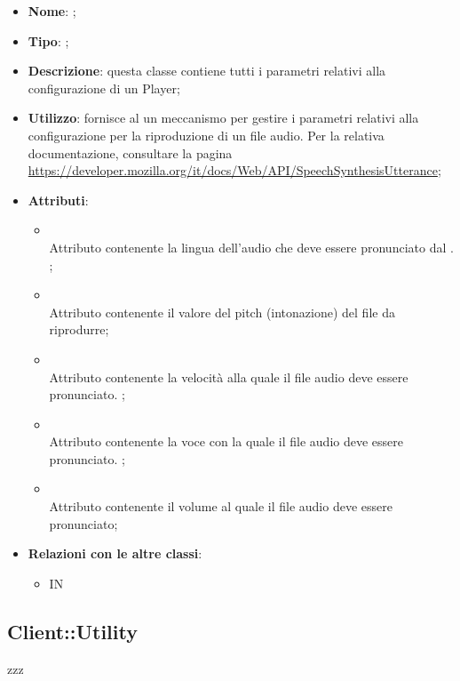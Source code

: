 \begin{itemize}
	\item \textbf{Nome}: ;
	\item \textbf{Tipo}: ;
	\item \textbf{Descrizione}: questa classe contiene tutti i parametri relativi alla configurazione di un Player;
	\item \textbf{Utilizzo}: fornisce al  un meccanismo per gestire i parametri relativi alla configurazione per la riproduzione di un file audio.
Per la relativa documentazione, consultare la pagina \url{https://developer.mozilla.org/it/docs/Web/API/SpeechSynthesisUtterance};
	\item \textbf{Attributi}:
	\begin{itemize}
		\item[]  \\
		Attributo contenente la lingua dell'audio che deve essere pronunciato dal . ;
		\item[]  \\
		Attributo contenente il valore del pitch (intonazione) del file da riprodurre;
		\item[]  \\
		Attributo contenente la velocità alla quale il file audio deve essere pronunciato. ;
		\item[]  \\
		Attributo contenente la voce con la quale il file audio deve essere pronunciato. ;
		\item[]  \\
		Attributo contenente il volume al quale il file audio deve essere pronunciato;
	\end{itemize}
	\item \textbf{Relazioni con le altre classi}:
	\begin{itemize}
		\item IN \hyperlink{Player_label}{}
	\end{itemize}
\end{itemize}

\subsection{Client::Utility}
zzz
